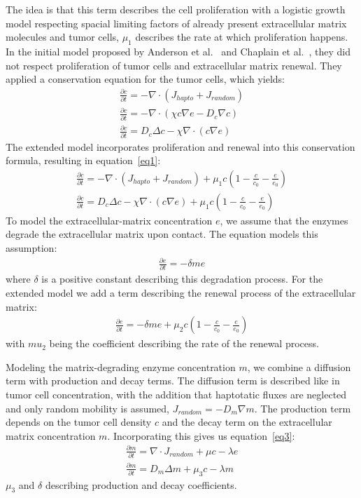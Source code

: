 The idea is that this term describes the cell proliferation with a logistic growth model respecting spacial limiting factors of already present extracellular matrix molecules and tumor cells, $\mu_1$ describes the rate at which proliferation happens. In the initial model proposed by Anderson et al.~\cite{anderson_continuous_1998, anderson_mathematical_2000} and Chaplain et al.~\cite{anderson_continuous_1998,chaplain_mathematical_2006,chaplain_mathematical_2006-1,franssen_mathematical_2019}, they did not respect proliferation of tumor cells and extracellular matrix renewal. They applied a conservation equation for the tumor cells, which yields:
\begin{align*}
    \frac{\partial c}{\partial t} = -\nabla \cdot (J_{hapto} + J_{random}) \\
    \frac{\partial c}{\partial t} = -\nabla \cdot (\chi c \nabla e -D_c \nabla c ) \\
    \frac{\partial c}{\partial t} = D_c \Delta c - \chi \nabla \cdot (c\nabla e)
\end{align*}
The extended model incorporates proliferation and renewal into this conservation formula, resulting in equation~\ref{eq1}:
\begin{align*}
    \frac{\partial c}{\partial t} = -\nabla \cdot (J_{hapto} + J_{random}) + \mu_1 c (1-\frac{c}{c_0} - \frac{e}{e_0}) \\
    \frac{\partial c}{\partial t} = D_c \Delta c - \chi \nabla \cdot (c\nabla e) + \mu_1 c (1-\frac{c}{c_0} - \frac{e}{e_0})
\end{align*}
To model the extracellular-matrix concentration $e$, we assume that the enzymes degrade the extracellular matrix upon contact. The equation models this assumption:
\begin{align*}
    \frac{\partial e}{\partial t} = -\delta m e
\end{align*}
where $\delta$ is a positive constant describing this degradation process. For the extended model we add a term describing the renewal process of the extracellular matrix: 
\begin{align*}
    \frac{\partial e}{\partial t} = -\delta m e + \mu_2 c (1 - \frac{c}{c_0} - \frac{e}{e_0})
\end{align*}
with $mu_2$ being the coefficient describing the rate of the renewal process.

Modeling the matrix-degrading enzyme concentration $m$, we combine a diffusion term with production and decay terms. The diffusion term is described like in tumor cell concentration, with the addition that haptotatic fluxes are neglected and only random mobility is assumed, $J_{random} = -D_m \nabla m$. The production term depends on the tumor cell density $c$ and the decay term on the extracellular matrix concentration $m$. Incorporating this gives us equation~\ref{eq3}:
\begin{align*}
    \frac{\partial m}{\partial t} = \nabla \cdot J_{random} + \mu c - \lambda e \\
    \frac{\partial m}{\partial t} = D_m \Delta m + \mu_3 c - \lambda m
\end{align*}
$\mu_3$ and $\delta$ describing production and decay coefficients.


